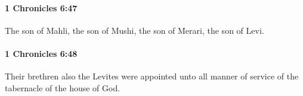		\paragraph{1 Chronicles 6:47} %
			\label{1CHRONICLES-6-47}

			The son of Mahli, the son of Mushi, the son of Merari, the son of Levi.


		\paragraph{1 Chronicles 6:48} %
			\label{1CHRONICLES-6-48}

			Their brethren also the Levites were appointed unto all manner of service of the tabernacle of the house of God.


